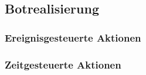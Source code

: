 
\subsection{Botrealisierung}
\subsubsection{Ereignisgesteuerte Aktionen}
\subsubsection{Zeitgesteuerte Aktionen}





